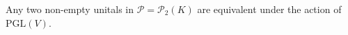 Any two non-empty unitals in $\mathcal{P} = \mathcal{P}_2(K)$ are equivalent under the action of $\text{PGL}(V)$.
